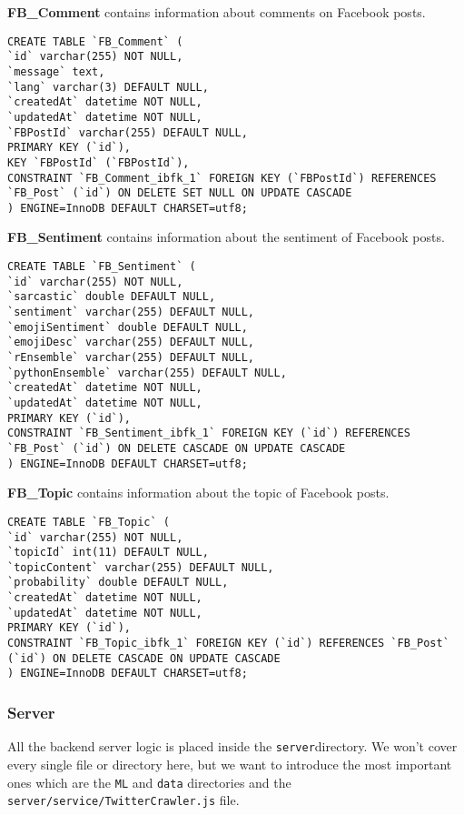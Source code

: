 \documentclass[]{article}
\begin{document}
\textbf{FB\_Comment} contains information about comments on Facebook
posts.

\begin{verbatim}
CREATE TABLE `FB_Comment` (
`id` varchar(255) NOT NULL,
`message` text,
`lang` varchar(3) DEFAULT NULL,
`createdAt` datetime NOT NULL,
`updatedAt` datetime NOT NULL,
`FBPostId` varchar(255) DEFAULT NULL,
PRIMARY KEY (`id`),
KEY `FBPostId` (`FBPostId`),
CONSTRAINT `FB_Comment_ibfk_1` FOREIGN KEY (`FBPostId`) REFERENCES `FB_Post` (`id`) ON DELETE SET NULL ON UPDATE CASCADE
) ENGINE=InnoDB DEFAULT CHARSET=utf8;
\end{verbatim}

\textbf{FB\_Sentiment} contains information about the sentiment of
Facebook posts.

\begin{verbatim}
CREATE TABLE `FB_Sentiment` (
`id` varchar(255) NOT NULL,
`sarcastic` double DEFAULT NULL,
`sentiment` varchar(255) DEFAULT NULL,
`emojiSentiment` double DEFAULT NULL,
`emojiDesc` varchar(255) DEFAULT NULL,
`rEnsemble` varchar(255) DEFAULT NULL,
`pythonEnsemble` varchar(255) DEFAULT NULL,
`createdAt` datetime NOT NULL,
`updatedAt` datetime NOT NULL,
PRIMARY KEY (`id`),
CONSTRAINT `FB_Sentiment_ibfk_1` FOREIGN KEY (`id`) REFERENCES `FB_Post` (`id`) ON DELETE CASCADE ON UPDATE CASCADE
) ENGINE=InnoDB DEFAULT CHARSET=utf8;
\end{verbatim}

\textbf{FB\_Topic} contains information about the topic of Facebook
posts.

\begin{verbatim}
CREATE TABLE `FB_Topic` (
`id` varchar(255) NOT NULL,
`topicId` int(11) DEFAULT NULL,
`topicContent` varchar(255) DEFAULT NULL,
`probability` double DEFAULT NULL,
`createdAt` datetime NOT NULL,
`updatedAt` datetime NOT NULL,
PRIMARY KEY (`id`),
CONSTRAINT `FB_Topic_ibfk_1` FOREIGN KEY (`id`) REFERENCES `FB_Post` (`id`) ON DELETE CASCADE ON UPDATE CASCADE
) ENGINE=InnoDB DEFAULT CHARSET=utf8;
\end{verbatim}

\subsubsection{Server}\label{server}

All the backend server logic is placed inside the
\texttt{server}directory. We won't cover every single file or directory
here, but we want to introduce the most important ones which are the
\texttt{ML} and \texttt{data} directories and the
\texttt{server/service/TwitterCrawler.js} file.
\end{document}
